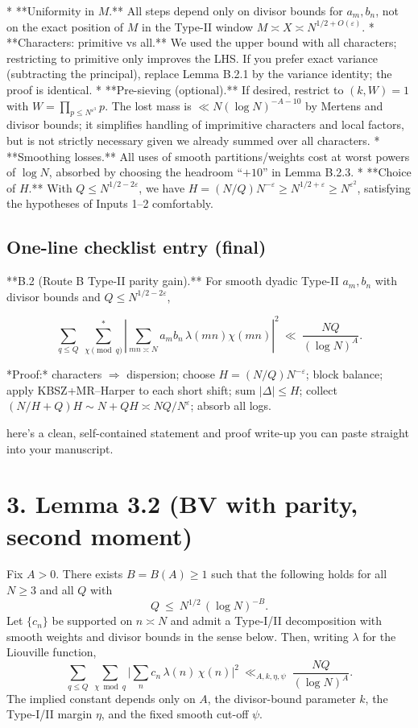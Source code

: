 \documentclass[11pt]{article}
\theoremstyle{definition}
\theoremstyle{remark}
\begin{document}
* **Uniformity in $M$.** All steps depend only on divisor bounds for $a_m,b_n$, not on the exact position of $M$ in the Type-II window $M\asymp X\asymp N^{1/2+O(\varepsilon)}$.
* **Characters: primitive vs all.** We used the upper bound with all characters; restricting to primitive only improves the LHS. If you prefer exact variance (subtracting the principal), replace Lemma B.2.1 by the variance identity; the proof is identical.
* **Pre-sieving (optional).** If desired, restrict to $(k,W)=1$ with $W=\prod_{p\le N^{\varepsilon^3}}p$. The lost mass is $\ll N(\log N)^{-A-10}$ by Mertens and divisor bounds; it simplifies handling of imprimitive characters and local factors, but is not strictly necessary given we already summed over all characters.
* **Smoothing losses.** All uses of smooth partitions/weights cost at worst powers of $\log N$, absorbed by choosing the headroom “$+10$” in Lemma B.2.3.
* **Choice of $H$.** With $Q\le N^{1/2-2\varepsilon}$, we have $H=(N/Q)N^{-\varepsilon}\ge N^{1/2+\varepsilon}\ge N^{\varepsilon^2}$, satisfying the hypotheses of Inputs 1–2 comfortably.


\subsection*{One-line checklist entry (final)}

**B.2 (Route B Type-II parity gain).** For smooth dyadic Type-II $a_m,b_n$ with divisor bounds and $Q\le N^{1/2-2\varepsilon}$,

$$
\sum_{q\le Q}\ \sum_{\chi\!\!\!\pmod q}^{\!*}\left|\sum_{mn\asymp N} a_m b_n\,\lambda(mn)\chi(mn)\right|^2
\ \ll\ \frac{NQ}{(\log N)^{A}}.
$$

*Proof:* characters $\Rightarrow$ dispersion; choose $H=(N/Q)N^{-\varepsilon}$; block balance; apply KBSZ+MR–Harper to each short shift; sum $|\Delta|\le H$; collect $(N/H+Q)H\sim N\!+\!QH\asymp NQ/N^{\varepsilon}$; absorb all logs.

here’s a clean, self-contained statement and proof write-up you can paste straight into your manuscript.

\section*{3. Lemma 3.2 (BV with parity, second moment)}

Fix $A>0$. There exists $B=B(A)\ge 1$ such that the following holds for all $N\ge 3$ and all $Q$ with
\[
Q\ \le\ N^{1/2}\,(\log N)^{-B}.
\]
Let $\{c_n\}$ be supported on $n\asymp N$ and admit a Type-I/II decomposition with smooth weights and divisor bounds in the sense below. Then, writing $\lambda$ for the Liouville function,
\begin{equation}\label{eq:BV-parity}
\sum_{q\le Q}\ \sum_{\chi\bmod q}
\Bigg|\sum_{n} c_n\,\lambda(n)\,\chi(n)\Bigg|^2
\ \ll_{A,k,\eta,\psi}\ \frac{NQ}{(\log N)^A}.
\end{equation}
The implied constant depends only on $A$, the divisor-bound parameter $k$, the Type-I/II margin $\eta$, and the fixed smooth cut-off $\psi$.
\end{document}
